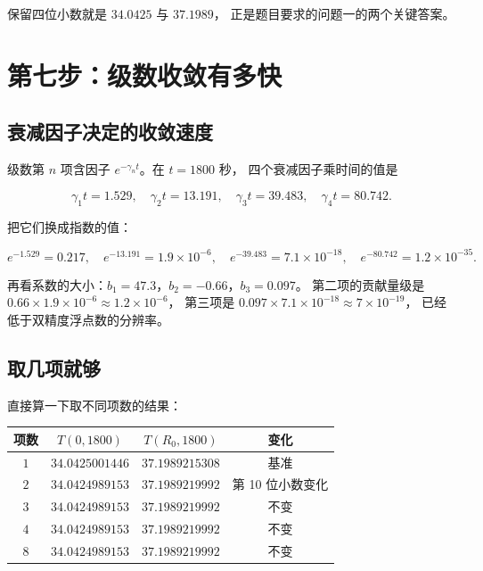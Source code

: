 保留四位小数就是 $34.0425$ 与 $37.1989$，
正是题目要求的问题一的两个关键答案。

\section{第七步：级数收敛有多快}

\subsection{衰减因子决定的收敛速度}

级数第 $n$ 项含因子 $e^{-\gamma_n t}$。在 $t=1800$ 秒，
四个衰减因子乘时间的值是

\begin{equation}
\gamma_1t=1.529,\quad
\gamma_2t=13.191,\quad
\gamma_3t=39.483,\quad
\gamma_4t=80.742 .
\label{eq:p6-gammat}
\end{equation}

把它们换成指数的值：

\begin{equation}
e^{-1.529}=0.217,\quad
e^{-13.191}=1.9\times10^{-6},\quad
e^{-39.483}=7.1\times10^{-18},\quad
e^{-80.742}=1.2\times10^{-35}.
\end{equation}

再看系数的大小：$b_1=47.3$，$b_2=-0.66$，$b_3=0.097$。
第二项的贡献量级是 $0.66\times1.9\times10^{-6}\approx1.2\times10^{-6}$，
第三项是 $0.097\times7.1\times10^{-18}\approx7\times10^{-19}$，
已经低于双精度浮点数的分辨率。

\subsection{取几项就够}

直接算一下取不同项数的结果：

\begin{center}
\begin{tabular}{@{}cccc@{}}
\toprule
项数 & $T(0,1800)$ & $T(R_0,1800)$ & 变化 \\
\midrule
$1$ & $34.0425001446$ & $37.1989215308$ & 基准 \\
$2$ & $34.0424989153$ & $37.1989219992$ & 第 10 位小数变化 \\
$3$ & $34.0424989153$ & $37.1989219992$ & 不变 \\
$4$ & $34.0424989153$ & $37.1989219992$ & 不变 \\
$8$ & $34.0424989153$ & $37.1989219992$ & 不变 \\
\bottomrule
\end{tabular}
\end{center}

